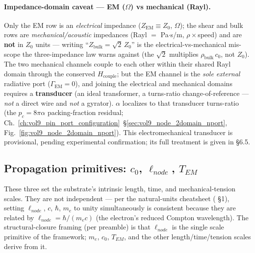 \paragraph{Impedance-domain caveat --- EM ($\Omega$) vs mechanical (Rayl).} Only the EM row is an \emph{electrical} impedance ($Z_{\mathrm{EM}}\equiv Z_0$, $\Omega$); the shear and bulk rows are \emph{mechanical/acoustic} impedances (Rayl $=$ Pa$\cdot$s/m, $\rho\times$speed) and are \textbf{not} in $Z_0$ units --- writing ``$Z_{\mathrm{bulk}} = \sqrt2\,Z_0$'' is the electrical-vs-mechanical mis-scope the three-impedance law warns against (the $\sqrt2$ multiplies $\rho_{\mathrm{bulk}}\,c_0$, not $Z_0$). The two mechanical channels couple to each other within their shared Rayl domain through the conserved $H_{\mathrm{couple}}$; but the EM channel is the \emph{sole external} radiative port ($\Gamma_{\mathrm{EM}}=0$), and joining the electrical and mechanical domains requires a \textbf{transducer} (an ideal transformer, a turns-ratio change-of-reference --- \emph{not} a direct wire and \emph{not} a gyrator). $\alpha$ localizes to that transducer turns-ratio (the $p_c = 8\pi\alpha$ packing-fraction residual; Ch.~\ref{ch:vol9_pin_port_configuration}~\S\ref{sec:vol9_node_2domain_nport}, Fig.~\ref{fig:vol9_node_2domain_nport}). This electromechanical transducer is provisional, pending experimental confirmation; its full treatment is given in  \S6.5.

\subsection{Propagation primitives: $c_0$, $\ell_{node}$, $T_{EM}$}
\label{subsec:vol9_dc_propagation_primitives}

These three set the substrate's intrinsic length, time, and mechanical-tension scales. They are not independent --- per the natural-units cheatsheet ( \S 1), setting $\ell_{node}$, $c$, $\hbar$, $m_e$ to unity simultaneously is consistent because they are related by $\ell_{node} = \hbar/(m_e c)$ (the electron's reduced Compton wavelength). The structural-closure framing (per  preamble) is that $\ell_{node}$ is the single scale primitive of the framework; $m_e$, $c_0$, $T_{EM}$, and the other length/time/tension scales derive from it.

